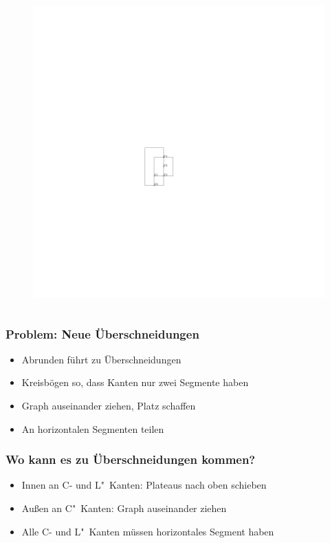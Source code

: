 \documentclass{beamer}
\begin{document}
\begin{frame}
\begin{columns}[c]
\begin{column}{5cm}
\begin{figure}[h]
  \includegraphics[scale=.7]{exampleA/orthogonalCompress}
  \label{fig:exampleAorthogonalNocompress}
\end{figure}
\end{column}
\end{columns}
\end{frame}

\begin{frame}
  \frametitle{Problem: Neue Überschneidungen}
  \begin{itemize}[<+->]
    \item Abrunden führt zu Überschneidungen
    \item Kreisbögen so, dass Kanten nur zwei Segmente haben
    \item Graph auseinander ziehen, Platz schaffen
    \item An horizontalen Segmenten teilen
  \end{itemize}
\end{frame}


\begin{frame}
  \frametitle{Wo kann es zu Überschneidungen kommen?}
  \begin{itemize}[<+->]
    \item Innen an C- und L"~Kanten: Plateaus nach oben schieben
    \item Außen an C"~Kanten: Graph auseinander ziehen
    \item Alle C- und L"~Kanten müssen horizontales Segment haben
  \end{itemize}
\end{frame}
\end{document}
